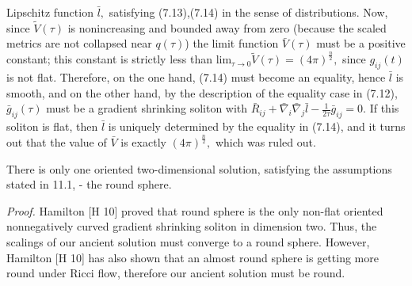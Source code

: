 \documentclass[12pt]{article}
\theoremstyle{plain}
{\swapnumbers
\newtheorem{thm}{Theorem}[section]
\newtheorem{cor}[thm]{Corollary}
\newtheorem{lem}[thm]{Lemma}
\newtheorem{prop}[thm]{Proposition}
}
\theoremstyle{definition}
{\swapnumbers
\newtheorem{defn}[thm]{Definition}
\newtheorem{nota}[thm]{Notation}
\newtheorem{parag}[thm]{}
\newtheorem*{parstr}{\addtocounter{thm}{1}\thesection.\arabic{thm}*}
\newtheorem*{intropar}{\addtocounter{thm}{1}\arabic{thm}}
}
\theoremstyle{remark} {\swapnumbers
\newtheorem{rem}[thm]{Remark}
\newtheorem{exam}[thm]{Example}
\newtheorem{lemma}[thm]{Lemma}
\newtheorem{claim}[thm]{Claim}
}
\numberwithin{equation}{section}
\begin{document}
\begin{parag}
  Lipschitz function $\bar{l},$ satisfying (7.13),(7.14) in the
  sense of distributions. Now, since $\tilde{V}(\tau)$ is
  nonincreasing and bounded away from zero (because the scaled
  metrics are not collapsed near $q(\tau)$) the limit function
  $\bar{V}(\tau)$ must be a positive constant; this constant is strictly less
  than $\mbox{lim}_{\tau\to
  0}\tilde{V}(\tau)=(4\pi)^{\frac{n}{2}},$ since $g_{ij}(t)$ is
  not
  flat. Therefore, on the one hand, (7.14) must become an
  equality, hence $\bar{l}$ is smooth, and on the other hand, by
  the description of the equality case in (7.12),
  $\bar{g}_{ij}(\tau)$ must be a gradient shrinking soliton with
  $\bar{R}_{ij}+\bar{\nabla}_i\bar{\nabla}_j
  \bar{l}-\frac{1}{2\tau}\bar{g}_{ij}=0.$ If this soliton is flat,
  then $\bar{l}$ is uniquely determined by the equality in (7.14),
  and it turns out that the value of $\bar{V}$ is exactly
  $(4\pi)^{\frac{n}{2}},$ which was ruled out.\end{parag}
  \begin{cor}
  There is only one  oriented two-dimensional
  solution, satisfying the assumptions stated in 11.1, - the round
  sphere. \end{cor} {\it Proof.}   Hamilton [H 10] proved that round sphere is the
  only
  non-flat oriented nonnegatively curved gradient shrinking soliton
  in dimension two. Thus, the scalings of our ancient solution
  must converge to a round sphere. However, Hamilton [H 10] has also
  shown that an almost round sphere is getting more round under
  Ricci flow, therefore our ancient solution must be round.
\end{document}
